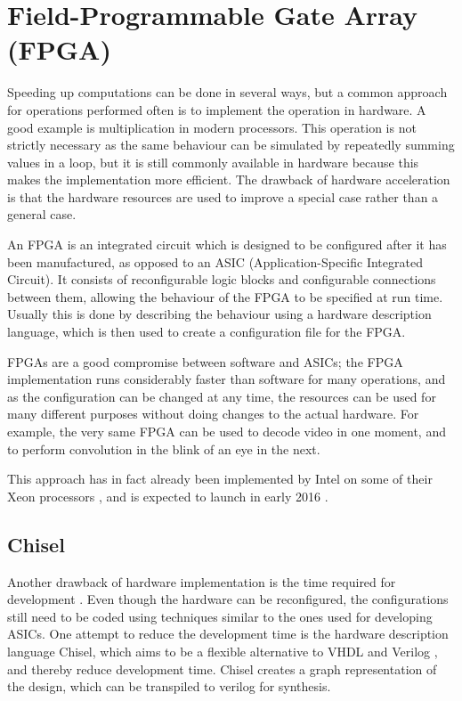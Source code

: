 \section{Field-Programmable Gate Array (FPGA)}
Speeding up computations can be done in several ways, but a common approach for operations performed often is to implement the operation in hardware.
A good example is multiplication in modern processors.
This operation is not strictly necessary as the same behaviour can be simulated by repeatedly summing values in a loop, but it is still commonly available in hardware because this makes the implementation more efficient.
The drawback of hardware acceleration is that the hardware resources are used to improve a special case rather than a general case.

An FPGA is an integrated circuit which is designed to be configured after it has been manufactured, as opposed to an ASIC (Application-Specific Integrated Circuit).
It consists of reconfigurable logic blocks and configurable connections between them, allowing the behaviour of the FPGA to be specified at run time. Usually this is done by describing the behaviour using a hardware description language, which is then used to create a configuration file for the FPGA.

FPGAs are a good compromise between software and ASICs; the FPGA implementation runs considerably faster than software for many operations, and as the configuration can be changed at any time, the resources can be used for many different purposes without doing changes to the actual hardware.
For example, the very same FPGA can be used to decode video in one moment, and to perform convolution in the blink of an eye in the next.

This approach has in fact already been implemented by Intel on some of their Xeon processors \cite{intelxeonfpga}, and is expected to launch in early 2016 \cite{PCWorldIntelFPGA}.

\subsection{Chisel}
\label{sec:chisel}
Another drawback of hardware implementation is the time required for development \cite{fpgaprosandcons}. 
Even though the hardware can be reconfigured, the configurations still need to be coded using techniques similar to the ones used for developing ASICs.
One attempt to reduce the development time is the hardware description language Chisel, which aims to be a flexible alternative to VHDL and Verilog \cite{chiselpaper}, and thereby reduce development time.
Chisel creates a graph representation of the design, which can be transpiled to verilog for synthesis.
